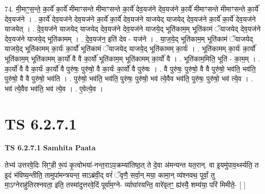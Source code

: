 \documentclass[17pt]{extarticle}
\begin{document}
74. मी॒माꣳ॒॒स॒न्ते॒ का॒र्ये॑ का॒र्ये॑ मीमाꣳसन्ते मीमाꣳसन्ते का॒र्ये॑ देव॒यज॑ने देव॒यज॑ने का॒र्ये॑ मीमाꣳसन्ते मीमाꣳसन्ते का॒र्ये॑ देव॒यज॑ने । . का॒र्ये॑ देव॒यज॑ने देव॒यज॑ने का॒र्ये॑ का॒र्ये॑ देव॒यज॑ने याजयेद् याजयेद् देव॒यज॑ने का॒र्ये॑ का॒र्ये॑ देव॒यज॑ने याजयेत् । . दे॒व॒यज॑ने याजयेद् याजयेद् देव॒यज॑ने देव॒यज॑ने याजये॒द् भूति॑काम॒म् भूति॑कामं ॅयाजयेद् देव॒यज॑ने देव॒यज॑ने याजये॒द् भूति॑कामम् । . दे॒व॒यज॑न॒ इति॑ देव - यज॑ने । . या॒ज॒ये॒द् भूति॑काम॒म् भूति॑कामं ॅयाजयेद् याजये॒द् भूति॑कामम् का॒र्यः॑ का॒र्यो॑ भूति॑कामं ॅयाजयेद् याजये॒द् भूति॑कामम् का॒र्यः॑ । . भूति॑कामम् का॒र्यः॑ का॒र्यो॑ भूति॑काम॒म् भूति॑कामम् का॒र्यो॑ वै वै का॒र्यो॑ भूति॑काम॒म् भूति॑कामम् का॒र्यो॑ वै । . भूति॑काम॒मिति॒ भूति॑ - का॒म॒म् । . का॒र्यो॑ वै वै का॒र्यः॑ का॒र्यो॑ वै पुरु॑षः॒ पुरु॑षो॒ वै का॒र्यः॑ का॒र्यो॑ वै पुरु॑षः । . वै पुरु॑षः॒ पुरु॑षो॒ वै वै पुरु॑षो॒ भव॑ति॒ भव॑ति॒ पुरु॑षो॒ वै वै पुरु॑षो॒ भव॑ति । . पुरु॑षो॒ भव॑ति॒ भव॑ति॒ पुरु॑षः॒ पुरु॑षो॒ भव॑ त्ये॒वैव भव॑ति॒ पुरु॑षः॒ पुरु॑षो॒ भव॑ त्ये॒व । . भव॑ त्ये॒वैव भव॑ति॒ भव॑ त्ये॒व । . ए॒वेत्ये॒व । \newline
\pagebreak
{}

\section{ TS 6.2.7.1 }

\textbf{TS 6.2.7.1 } \newline
\textbf{Samhita Paata} \newline

तेभ्य॑ उत्तरवे॒दिः सिꣳ॒॒॒ही रू॒पं कृ॒त्वोभया॑-नन्त॒राऽप॒क्रम्या॑तिष्ठ॒त् ते दे॒वा अ॑मन्यन्त यत॒रान्. वा इ॒यमु॑पाव॒र्थ्स्यति॒ त इ॒दं भ॑विष्य॒न्तीति॒ तामुपा॑मन्त्रयन्त॒ साऽब्र॑वी॒द् वरं॑ ॅवृणै॒ सर्वा॒न् मया॒ कामा॒न् व्य॑श्नवथ॒ पूर्वां॒ तु मा॒ऽग्नेराहु॑तिरश्नवता॒ इति॒ तस्मा॑दुत्तरवे॒दिं पूर्वा॑म॒ग्ने- र्व्याघा॑रयन्ति॒ वारे॑वृतꣳ॒॒ ह्य॑स्यै॒ शम्य॑या॒ परि॑ मिमीते॒- [  ] \newline
\end{document}
